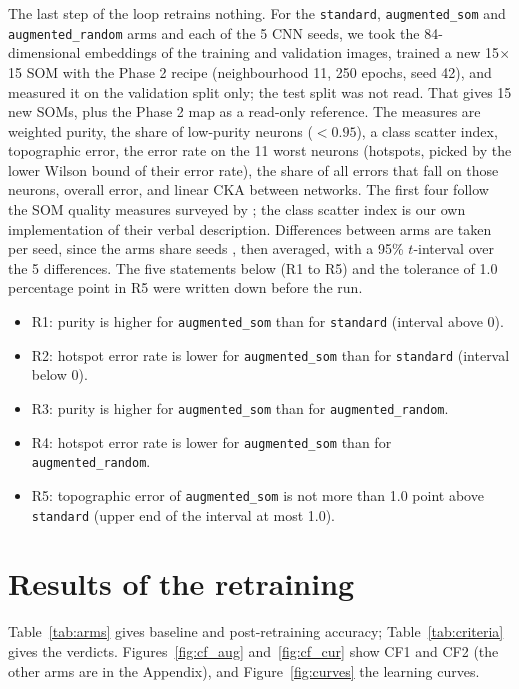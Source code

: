 \documentclass[11pt]{article}
\begin{document}
The last step of the loop retrains nothing. For the \texttt{standard}, \texttt{augmented\_som} and \texttt{augmented\_random} arms and each of the 5 CNN seeds, we took the 84-dimensional embeddings of the training and validation images, trained a new 15$\times$15 SOM with the Phase 2 recipe (neighbourhood 11, 250 epochs, seed 42), and measured it on the validation split only; the test split was not read. That gives 15 new SOMs, plus the Phase 2 map as a read-only reference. The measures are weighted purity, the share of low-purity neurons ($<0.95$), a class scatter index, topographic error, the error rate on the 11 worst neurons (hotspots, picked by the lower Wilson bound of their error rate), the share of all errors that fall on those neurons, overall error, and linear CKA \parencite{kornblith2019cka} between networks. The first four follow the SOM quality measures surveyed by \textcite{forest2020somsurvey}; the class scatter index is our own implementation of their verbal description. Differences between arms are taken per seed, since the arms share seeds \parencite{bouthillier2021variance}, then averaged, with a 95\% $t$-interval over the 5 differences. The five statements below (R1 to R5) and the tolerance of 1.0 percentage point in R5 were written down before the run.

\begin{itemize}[leftmargin=1.4em, itemsep=1pt]
  \item R1: purity is higher for \texttt{augmented\_som} than for \texttt{standard} (interval above 0).
  \item R2: hotspot error rate is lower for \texttt{augmented\_som} than for \texttt{standard} (interval below 0).
  \item R3: purity is higher for \texttt{augmented\_som} than for \texttt{augmented\_random}.
  \item R4: hotspot error rate is lower for \texttt{augmented\_som} than for \texttt{augmented\_random}.
  \item R5: topographic error of \texttt{augmented\_som} is not more than 1.0 point above \texttt{standard} (upper end of the interval at most 1.0).
\end{itemize}

\section{Results of the retraining}

Table~\ref{tab:arms} gives baseline and post-retraining accuracy; Table~\ref{tab:criteria} gives the verdicts. Figures~\ref{fig:cf_aug} and~\ref{fig:cf_cur} show CF1 and CF2 (the other arms are in the Appendix), and Figure~\ref{fig:curves} the learning curves.
\end{document}
